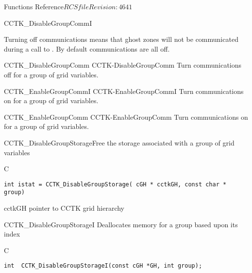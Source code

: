 \begin{cactuspart}{ Functions Reference}{$RCSfile$}{$Revision: 4641 $}
\begin{FunctionDescription}{CCTK\_DisableGroupCommI}
\begin{Discussion}
Turning off communications means that ghost zones will not be
communicated during a call to . By default
communications are all off.
\end{Discussion}

\begin{SeeAlsoSection}
\begin{SeeAlso2} {CCTK\_DisableGroupComm} {CCTK-DisableGroupComm}
Turn communications off for a group of grid variables.
\end{SeeAlso2}
\begin{SeeAlso2} {CCTK\_EnableGroupCommI} {CCTK-EnableGroupCommI}
Turn communications on for a group of grid variables.
\end{SeeAlso2}
\begin{SeeAlso2} {CCTK\_EnableGroupComm} {CCTK-EnableGroupComm}
Turn communications on for a group of grid variables.
\end{SeeAlso2}
\end{SeeAlsoSection}

\end{FunctionDescription}

\begin{FunctionDescription}{CCTK\_DisableGroupStorage}{Free the storage associated with a group of grid variables}
\label{CCTK-DisableGroupStorage}
\begin{SynopsisSection}
\begin{Synopsis}{C}
\begin{verbatim}int istat = CCTK_DisableGroupStorage( cGH * cctkGH, const char * group)\end{verbatim}
\end{Synopsis}
\end{SynopsisSection}
\begin{ParameterSection}
\begin{Parameter}{cctkGH}
pointer to CCTK grid hierarchy
\end{Parameter}
\end{ParameterSection}
\end{FunctionDescription}

\begin{FunctionDescription}{CCTK\_DisableGroupStorageI}
\label{CCTK-DisableGroupStorageI}
Deallocates memory for a group based upon its index
\begin{SynopsisSection}
\begin{Synopsis}{C}
\begin{verbatim}int  CCTK_DisableGroupStorageI(const cGH *GH, int group);\end{verbatim}
\end{Synopsis}
\end{SynopsisSection}


\end{FunctionDescription}
\end{cactuspart}
